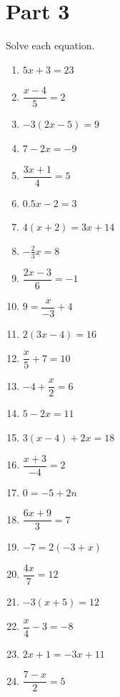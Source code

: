 \documentclass[10pt]{article}
\theoremstyle{definition}
\theoremstyle{plain}
\numberwithin{equation}{section}
\begin{document}
\section*{Part 3}
\begin{multicolblock}{Solve each equation.}
\begin{enumerate}
  \item $5x + 3 = 23$
  \item $\dfrac{x - 4}{5} = 2$
  \item $-3(2x - 5) = 9$
  \item $7 - 2x = -9$
  \item $\dfrac{3x + 1}{4} = 5$
  \item $0.5x - 2 = 3$
  \item $4(x + 2) = 3x + 14$
  \item $-\tfrac{2}{3}x = 8$
  \item $\dfrac{2x - 3}{6} = -1$
  \item $9 = \dfrac{x}{-3} + 4$
  \item $2(3x - 4) = 16$
  \item $\dfrac{x}{5} + 7 = 10$
  \item $-4 + \dfrac{x}{2} = 6$
  \item $5 - 2x = 11$
  \item $3(x - 4) + 2x = 18$
  \item $\dfrac{x + 3}{-4} = 2$
  \item $0 = -5 + 2n$
  \item $\dfrac{6x + 9}{3} = 7$
  \item $-7 = 2(-3 + x)$
  \item $\dfrac{4x}{7} = 12$
  \item $-3(x + 5) = 12$
  \item $\dfrac{x}{4} - 3 = -8$
  \item $2x + 1 = -3x + 11$
  \item $\dfrac{7 - x}{2} = 5$
\end{enumerate}
\end{multicolblock}
\end{document}
